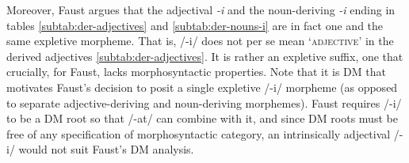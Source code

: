 Moreover, Faust argues that the adjectival \textit{-i} and 
the noun-deriving \textit{-i} ending in tables 
\ref{subtab:der-adjectives} and \ref{subtab:der-nouns-i} 
are in fact one and the same expletive morpheme. That is, 
/-i/ does not per se mean `\textsc{adjective}' in the derived adjectives 
\ref{subtab:der-adjectives}. It is rather an expletive suffix, one that 
crucially, for Faust, lacks morphosyntactic properties.
Note that it is \ac{DM} that motivates Faust's decision to posit a single 
expletive /-i/ morpheme (as opposed to 
separate adjective-deriving and noun-deriving morphemes).  Faust 
requires /-i/ to be a \ac{DM} root so that /-at/ can combine with it, and since 
\ac{DM} roots must be free of any specification of morphosyntactic 
category, an intrinsically adjectival /-i/ would
not suit Faust's \ac{DM} analysis. 



